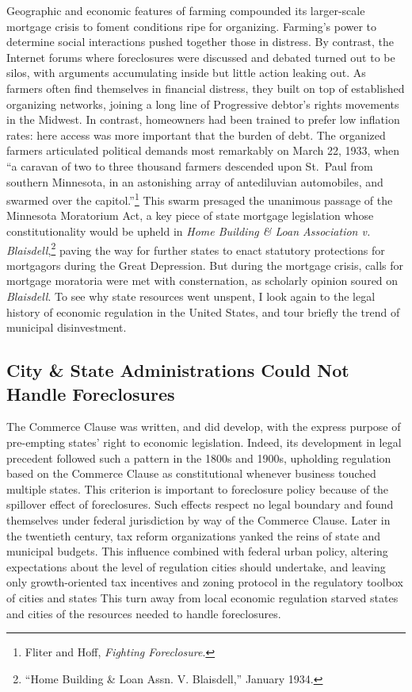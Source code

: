 \documentclass[12pt,oneside]{psthesis}
\begin{document}
Geographic and economic features of farming compounded its larger-scale mortgage crisis to foment conditions ripe for organizing.
Farming's power to determine social interactions pushed together those in distress.
By contrast, the Internet forums where foreclosures were discussed and debated turned out to be silos, with arguments accumulating inside but little action leaking out.
As farmers often find themselves in financial distress, they built on top of established organizing networks, joining a long line of Progressive debtor's rights movements in the Midwest.
In contrast, homeowners had been trained to prefer low inflation rates: here access was more important that the burden of debt.
The organized farmers articulated political demands most remarkably on March 22, 1933, when ``a caravan of two to three thousand farmers descended upon St.~Paul from southern Minnesota, in an astonishing array of antediluvian automobiles, and swarmed over the capitol.''\footnote{Fliter and Hoff, \emph{Fighting Foreclosure}.}
This swarm presaged the unanimous passage of the Minnesota Moratorium Act, a key piece of state mortgage legislation whose constitutionality would be upheld in \emph{Home Building \& Loan Association v. Blaisdell},\footnote{``Home Building \& Loan Assn. V. Blaisdell,'' January 1934.} paving the way for further states to enact statutory protections for mortgagors during the Great Depression.
But during the mortgage crisis, calls for mortgage moratoria were met with consternation, as scholarly opinion soured on \emph{Blaisdell}.
To see why state resources went unspent, I look again to the legal history of economic regulation in the United States, and tour briefly the trend of municipal disinvestment.

\hypertarget{cities-states}{%
\subsection{City \& State Administrations Could Not Handle Foreclosures}\label{cities-states}}

The Commerce Clause was written, and did develop, with the express purpose of pre-empting states' right to economic legislation.
Indeed, its development in legal precedent followed such a pattern in the 1800s and 1900s, upholding regulation based on the Commerce Clause as constitutional whenever business touched multiple states.
This criterion is important to foreclosure policy because of the spillover effect of foreclosures.
Such effects respect no legal boundary and found themselves under federal jurisdiction by way of the Commerce Clause.
Later in the twentieth century, tax reform organizations yanked the reins of state and municipal budgets.
This influence combined with federal urban policy, altering expectations about the level of regulation cities should undertake, and leaving only growth-oriented tax incentives and zoning protocol in the regulatory toolbox of cities and states
This turn away from local economic regulation starved states and cities of the resources needed to handle foreclosures.
\end{document}
